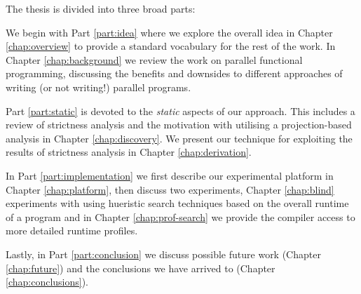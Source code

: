 The thesis is divided into three broad parts:

We begin with Part \ref{part:idea} where we explore the overall idea in Chapter
\ref{chap:overview} to provide a standard vocabulary for the rest of the work.
In Chapter \ref{chap:background} we review the work on parallel functional
programming, discussing the benefits and downsides to different approaches of
writing (or not writing!) parallel programs.

Part \ref{part:static} is devoted to the \emph{static} aspects of our approach.
This includes a review of strictness analysis and the motivation with utilising
a projection-based analysis in Chapter \ref{chap:discovery}. We present our
technique for exploiting the results of strictness analysis in Chapter
\ref{chap:derivation}.

In Part \ref{part:implementation} we first describe our experimental platform
in Chapter \ref{chap:platform}, then discuss two experiments, Chapter
\ref{chap:blind} experiments with using hueristic search techniques based on
the overall runtime of a program and in Chapter \ref{chap:prof-search} we
provide the compiler access to more detailed runtime profiles. 

Lastly, in Part \ref{part:conclusion} we discuss possible future work (Chapter
\ref{chap:future}) and the conclusions we have arrived to (Chapter
\ref{chap:conclusions}).
